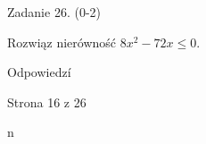 \documentclass[a4paper,12pt]{article}
\begin{document}
Zadanie 26. (0-2)

Rozwiąz nierówność $8x^{2}-72x\leq 0.$

Odpowiedzí

Strona 16 z 26

n
\end{document}

